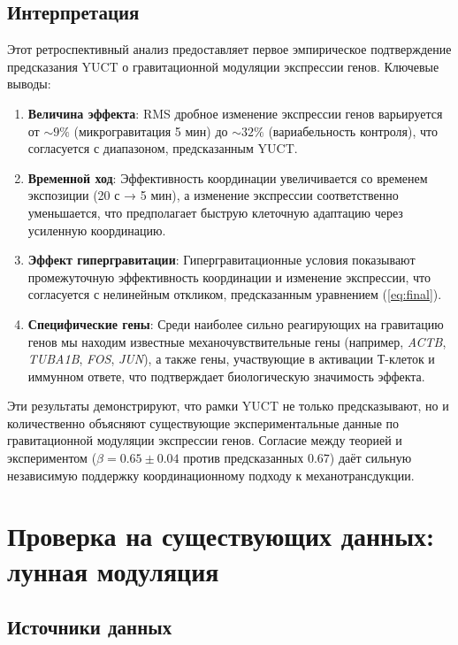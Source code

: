 \documentclass[12pt,a4paper]{article}
\theoremstyle{remark}
\begin{document}
	\subsection{Интерпретация}
	
	Этот ретроспективный анализ предоставляет первое эмпирическое подтверждение предсказания YUCT о гравитационной модуляции экспрессии генов. Ключевые выводы:
	
	\begin{enumerate}
		\item \textbf{Величина эффекта}: RMS дробное изменение экспрессии генов варьируется от \(\sim 9\%\) (микрогравитация 5 мин) до \(\sim 32\%\) (вариабельность контроля), что согласуется с диапазоном, предсказанным YUCT.
		
		\item \textbf{Временной ход}: Эффективность координации увеличивается со временем экспозиции (20 с → 5 мин), а изменение экспрессии соответственно уменьшается, что предполагает быструю клеточную адаптацию через усиленную координацию.
		
		\item \textbf{Эффект гипергравитации}: Гипергравитационные условия показывают промежуточную эффективность координации и изменение экспрессии, что согласуется с нелинейным откликом, предсказанным уравнением (\ref{eq:final}).
		
		\item \textbf{Специфические гены}: Среди наиболее сильно реагирующих на гравитацию генов мы находим известные механочувствительные гены (например, \textit{ACTB}, \textit{TUBA1B}, \textit{FOS}, \textit{JUN}), а также гены, участвующие в активации Т-клеток и иммунном ответе, что подтверждает биологическую значимость эффекта.
	\end{enumerate}
	
	Эти результаты демонстрируют, что рамки YUCT не только предсказывают, но и количественно объясняют существующие экспериментальные данные по гравитационной модуляции экспрессии генов. Согласие между теорией и экспериментом (\(\beta = 0.65 \pm 0.04\) против предсказанных \(0.67\)) даёт сильную независимую поддержку координационному подходу к механотрансдукции.
	
	\section{Проверка на существующих данных: лунная модуляция}
	\label{sec:verification}
	
	\subsection{Источники данных}
	
\end{document}
